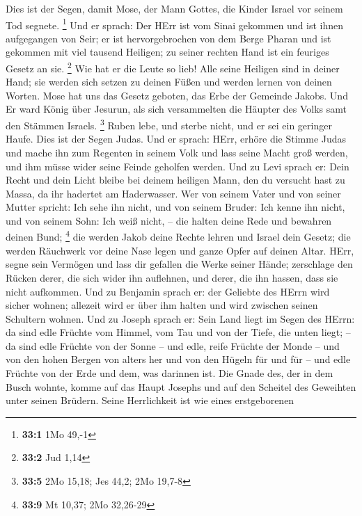  Dies ist der Segen, damit Mose, der Mann Gottes, die
Kinder Israel vor seinem Tod segnete. \footnote{\textbf{33:1} 1Mo 49,-1}
 Und er sprach: Der HErr ist vom Sinai gekommen und ist
ihnen aufgegangen von Seir; er ist hervorgebrochen von dem Berge Pharan
und ist gekommen mit viel tausend Heiligen; zu seiner rechten Hand ist
ein feuriges Gesetz an sie. \footnote{\textbf{33:2} Jud 1,14}
 Wie hat er die Leute so lieb! Alle seine Heiligen sind in
deiner Hand; sie werden sich setzen zu deinen Füßen und werden lernen
von deinen Worten.  Mose hat uns das Gesetz geboten, das
Erbe der Gemeinde Jakobs.  Und Er ward König über Jesurun,
als sich versammelten die Häupter des Volks samt den Stämmen Israels.
\footnote{\textbf{33:5} 2Mo 15,18; Jes 44,2; 2Mo 19,7-8} 
Ruben lebe, und sterbe nicht, und er sei ein geringer Haufe.
 Dies ist der Segen Judas. Und er sprach: HErr, erhöre die
Stimme Judas und mache ihn zum Regenten in seinem Volk und lass seine
Macht groß werden, und ihm müsse wider seine Feinde geholfen werden.
 Und zu Levi sprach er: Dein Recht und dein Licht bleibe
bei deinem heiligen Mann, den du versucht hast zu Massa, da ihr hadertet
am Haderwasser.  Wer von seinem Vater und von seiner
Mutter spricht: Ich sehe ihn nicht, und von seinem Bruder: Ich kenne ihn
nicht, und von seinem Sohn: Ich weiß nicht, -- die halten deine Rede und
bewahren deinen Bund; \footnote{\textbf{33:9} Mt 10,37; 2Mo 32,26-29}
 die werden Jakob deine Rechte lehren und Israel dein
Gesetz; die werden Räuchwerk vor deine Nase legen und ganze Opfer auf
deinen Altar.  HErr, segne sein Vermögen und lass dir
gefallen die Werke seiner Hände; zerschlage den Rücken derer, die sich
wider ihn auflehnen, und derer, die ihn hassen, dass sie nicht
aufkommen.  Und zu Benjamin sprach er: der Geliebte des
HErrn wird sicher wohnen; allezeit wird er über ihm halten und wird
zwischen seinen Schultern wohnen.  Und zu Joseph sprach
er: Sein Land liegt im Segen des HErrn: da sind edle Früchte vom Himmel,
vom Tau und von der Tiefe, die unten liegt; --  da sind
edle Früchte von der Sonne -- und edle, reife Früchte der Monde --
 und von den hohen Bergen von alters her und von den
Hügeln für und für --  und edle Früchte von der Erde und
dem, was darinnen ist. Die Gnade des, der in dem Busch wohnte, komme auf
das Haupt Josephs und auf den Scheitel des Geweihten unter seinen
Brüdern.  Seine Herrlichkeit ist wie eines erstgeborenen

